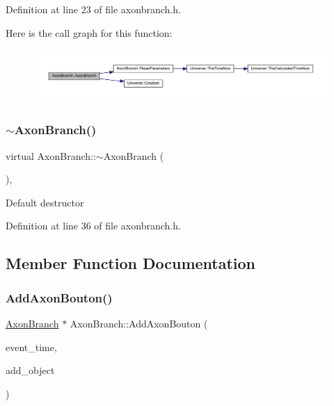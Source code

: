 Definition at line 23 of file axonbranch.\+h.

Here is the call graph for this function\+:
\nopagebreak
\begin{figure}[H]
\begin{center}
\leavevmode
\includegraphics[width=350pt]{class_axon_branch_a98f33462edf82dacab750d1140172912_cgraph}
\end{center}
\end{figure}
\mbox{\label{class_axon_branch_ae4ef4c954b43d084cafb30cf900a1728}} 
\subsubsection{\texorpdfstring{$\sim$\+Axon\+Branch()}{~AxonBranch()}}
{\footnotesize\ttfamily virtual Axon\+Branch\+::$\sim$\+Axon\+Branch (\begin{DoxyParamCaption}{ }\end{DoxyParamCaption})\hspace{0.3cm}{\ttfamily [inline]}, {\ttfamily [virtual]}}

Default destructor 

Definition at line 36 of file axonbranch.\+h.



\subsection{Member Function Documentation}
\mbox{\label{class_axon_branch_a88e6af84b45bb6f6f8900a6d4aec446c}} 
\subsubsection{\texorpdfstring{Add\+Axon\+Bouton()}{AddAxonBouton()}}
{\footnotesize\ttfamily \hyperlink{class_axon_branch}{Axon\+Branch} $\ast$ Axon\+Branch\+::\+Add\+Axon\+Bouton (\begin{DoxyParamCaption}\item[{std\+::chrono\+::time\+\_\+point$<$ \hyperlink{universe_8h_a0ef8d951d1ca5ab3cfaf7ab4c7a6fd80}{Clock} $>$}]{event\+\_\+time,  }\item[{\hyperlink{class_axon_branch}{Axon\+Branch} $\ast$}]{add\+\_\+object }\end{DoxyParamCaption})}



